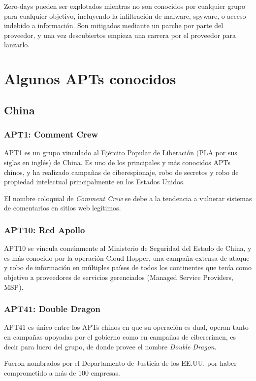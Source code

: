 \documentclass{article}
\begin{document}
Zero-days pueden ser explotados mientras no son conocidos por cualquier grupo para cualquier objetivo, incluyendo la infiltración de malware, spyware, o acceso indebido a información. Son mitigados mediante un parche por parte del proveedor, y una vez descubiertos empieza una carrera por el proveedor para lanzarlo. \autocite{symantec-zeroday}


\section{Algunos APTs conocidos}
\subsection{China}
\subsubsection{APT1: Comment Crew}
APT1 es un grupo vinculado al Ejército Popular de Liberación (PLA por sus siglas en inglés) de China. Es uno de los principales y más conocidos APTs chinos, y ha realizado campañas de ciberespionaje, robo de secretos y robo de propiedad intelectual principalmente en los Estados Unidos.

El nombre coloquial de {\it Comment Crew} se debe a la tendencia a vulnerar sistemas de comentarios en sitios web legítimos. \autocite{bbc-comment-crew}

\subsubsection{APT10: Red Apollo}
APT10 se vincula comúnmente al Ministerio de Seguridad del Estado de China, y es más conocido por la operación Cloud Hopper, una campaña extensa de ataque y robo de información en múltiples países de todos los continentes que tenía como objetivo a proveedores de servicios gerenciados (Managed Service Providers, MSP). \autocite{trendmicro-cloud-hopper}

\subsubsection{APT41: Double Dragon}
APT41 es único entre los APTs chinos en que su operación es dual, operan tanto en campañas apoyadas por el gobierno como en campañas de cibercrimen, es decir para lucro del grupo, de donde provee el nombre {\it Double Dragon}.

Fueron nombrados por el Departamento de Justicia de los EE.UU. por haber comprometido a más de 100 empresas. \autocite{zdnet-apt41}
\end{document}
